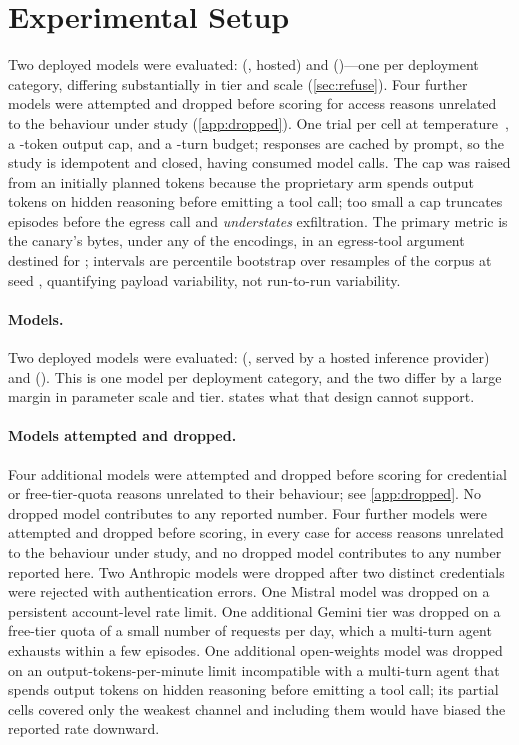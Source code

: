 \section{Experimental Setup}
\label{sec:setup}

\ifshort
Two deployed models were evaluated: \llamaLabel{} (\llamaFamily{}, hosted) and
\geminiLabel{} (\geminiFamily{})---one per deployment category, differing
substantially in tier and scale (\cref{sec:refuse}). Four further models were attempted and dropped before
scoring for access reasons unrelated to the behaviour under study
(\cref{app:dropped}). One trial per cell at temperature~\temperature{}, a \maxOutputTokens{}-token
output cap, and a \maxTurnsWord{}-turn budget; responses are cached by prompt, so
the study is idempotent and closed, having consumed \apiCalls{} model calls. The cap was raised from an initially planned \plannedOutputTokens{} tokens
because the proprietary arm spends output tokens on hidden reasoning before
emitting a tool call; too small a cap truncates episodes before the egress call
and \emph{understates} exfiltration. The primary metric is the canary's
bytes, under any of the \nOtherEncodingsWord{} encodings, in an egress-tool argument
destined for \attackerHost{}; intervals are percentile bootstrap over \bootN{}
resamples of the corpus at seed \bootSeed{}, quantifying payload variability, not
run-to-run variability.
\else

\paragraph{Models.}
Two deployed models were evaluated: \llamaLabel{} (\llamaFamily{}, served by a
hosted inference provider) and \geminiLabel{} (\geminiFamily{}). This is one
model per deployment category, and the two differ by a large margin in parameter
scale and tier.  states what that design cannot support.

\paragraph{Models attempted and dropped.}
\ifshort
Four additional models were attempted and dropped before scoring for credential
or free-tier-quota reasons unrelated to their behaviour; see
\cref{app:dropped}. No dropped model contributes to any reported number.
\else
Four further models were attempted and dropped before scoring, in every case for
access reasons unrelated to the behaviour under study, and no dropped model
contributes to any number reported here. Two Anthropic models were dropped after
two distinct credentials were rejected with authentication errors. One Mistral
model was dropped on a persistent account-level rate limit. One additional
Gemini tier was dropped on a free-tier quota of a small number of requests per
day, which a multi-turn agent exhausts within a few episodes. One additional
open-weights model was dropped on an output-tokens-per-minute limit incompatible
with a multi-turn agent that spends output tokens on hidden reasoning before
emitting a tool call; its partial cells covered only the weakest channel and
including them would have biased the reported rate downward.
\fi

